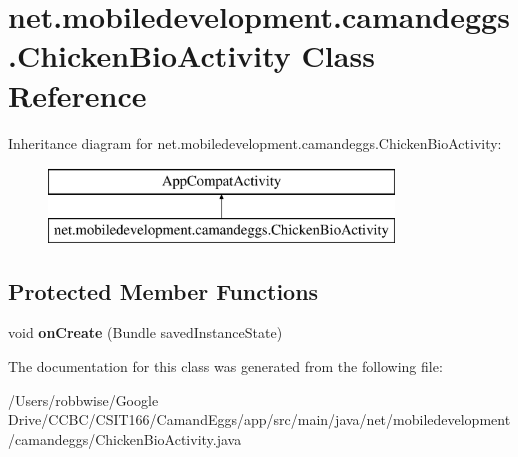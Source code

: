 \hypertarget{classnet_1_1mobiledevelopment_1_1camandeggs_1_1_chicken_bio_activity}{}\section{net.\+mobiledevelopment.\+camandeggs.\+Chicken\+Bio\+Activity Class Reference}
\label{classnet_1_1mobiledevelopment_1_1camandeggs_1_1_chicken_bio_activity}
Inheritance diagram for net.\+mobiledevelopment.\+camandeggs.\+Chicken\+Bio\+Activity\+:\begin{figure}[H]
\begin{center}
\leavevmode
\includegraphics[height=2.000000cm]{classnet_1_1mobiledevelopment_1_1camandeggs_1_1_chicken_bio_activity}
\end{center}
\end{figure}
\subsection*{Protected Member Functions}
\begin{DoxyCompactItemize}
\item 
\mbox{\label{classnet_1_1mobiledevelopment_1_1camandeggs_1_1_chicken_bio_activity_a3e35a36a0747fb2d80cefab776ae40b1}} 
void {\bfseries on\+Create} (Bundle saved\+Instance\+State)
\end{DoxyCompactItemize}


The documentation for this class was generated from the following file\+:\begin{DoxyCompactItemize}
\item 
/\+Users/robbwise/\+Google Drive/\+C\+C\+B\+C/\+C\+S\+I\+T166/\+Camand\+Eggs/app/src/main/java/net/mobiledevelopment/camandeggs/Chicken\+Bio\+Activity.\+java\end{DoxyCompactItemize}
